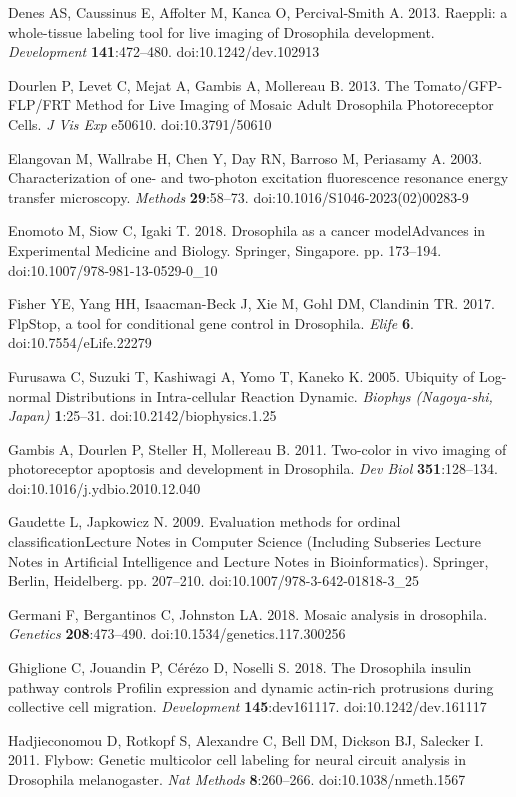 Denes AS, Caussinus E, Affolter M, Kanca O, Percival-Smith A. 2013. Raeppli: a whole-tissue labeling tool for live imaging of Drosophila development. \emph{Development} \textbf{141}:472--480. doi:10.1242/dev.102913

Dourlen P, Levet C, Mejat A, Gambis A, Mollereau B. 2013. The Tomato/GFP-FLP/FRT Method for Live Imaging of Mosaic Adult Drosophila Photoreceptor Cells. \emph{J Vis Exp} e50610. doi:10.3791/50610

Elangovan M, Wallrabe H, Chen Y, Day RN, Barroso M, Periasamy A. 2003. Characterization of one- and two-photon excitation fluorescence resonance energy transfer microscopy. \emph{Methods} \textbf{29}:58--73. doi:10.1016/S1046-2023(02)00283-9

Enomoto M, Siow C, Igaki T. 2018. Drosophila as a cancer modelAdvances in Experimental Medicine and Biology. Springer, Singapore. pp. 173--194. doi:10.1007/978-981-13-0529-0\_10

Fisher YE, Yang HH, Isaacman-Beck J, Xie M, Gohl DM, Clandinin TR. 2017. FlpStop, a tool for conditional gene control in Drosophila. \emph{Elife} \textbf{6}. doi:10.7554/eLife.22279

Furusawa C, Suzuki T, Kashiwagi A, Yomo T, Kaneko K. 2005. Ubiquity of Log-normal Distributions in Intra-cellular Reaction Dynamic. \emph{Biophys (Nagoya-shi, Japan)} \textbf{1}:25--31. doi:10.2142/biophysics.1.25

Gambis A, Dourlen P, Steller H, Mollereau B. 2011. Two-color in vivo imaging of photoreceptor apoptosis and development in Drosophila. \emph{Dev Biol} \textbf{351}:128--134. doi:10.1016/j.ydbio.2010.12.040

Gaudette L, Japkowicz N. 2009. Evaluation methods for ordinal classificationLecture Notes in Computer Science (Including Subseries Lecture Notes in Artificial Intelligence and Lecture Notes in Bioinformatics). Springer, Berlin, Heidelberg. pp. 207--210. doi:10.1007/978-3-642-01818-3\_25

Germani F, Bergantinos C, Johnston LA. 2018. Mosaic analysis in drosophila. \emph{Genetics} \textbf{208}:473--490. doi:10.1534/genetics.117.300256

Ghiglione C, Jouandin P, Cérézo D, Noselli S. 2018. The Drosophila insulin pathway controls Profilin expression and dynamic actin-rich protrusions during collective cell migration. \emph{Development} \textbf{145}:dev161117. doi:10.1242/dev.161117

Hadjieconomou D, Rotkopf S, Alexandre C, Bell DM, Dickson BJ, Salecker I. 2011. Flybow: Genetic multicolor cell labeling for neural circuit analysis in Drosophila melanogaster. \emph{Nat Methods} \textbf{8}:260--266. doi:10.1038/nmeth.1567

